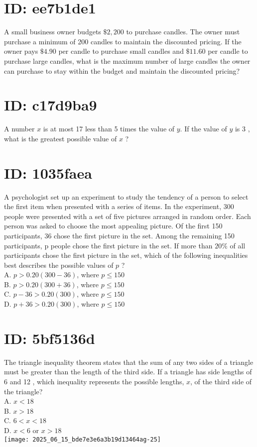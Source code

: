 
\section*{ID: ee7b1de1}
A small business owner budgets $\$ 2,200$ to purchase candles. The owner must purchase a minimum of 200 candles to maintain the discounted pricing. If the owner pays $\$ 4.90$ per candle to purchase small candles and $\$ 11.60$ per candle to purchase large candles, what is the maximum number of large candles the owner can purchase to stay within the budget and maintain the discounted pricing?

\section*{ID: c17d9ba9}
A number $x$ is at most 17 less than 5 times the value of $y$. If the value of $y$ is 3 , what is the greatest possible value of $x$ ?

\section*{ID: 1035faea}
A psychologist set up an experiment to study the tendency of a person to select the first item when presented with a series of items. In the experiment, 300 people were presented with a set of five pictures arranged in random order. Each person was asked to choose the most appealing picture. Of the first 150 participants, 36 chose the first picture in the set. Among the remaining 150 participants, p people chose the first picture in the set. If more than $20 \%$ of all participants chose the first picture in the set, which of the following inequalities best describes the possible values of $p$ ?\\
A. $p>0.20(300-36)$, where $p \leq 150$\\
B. $p>0.20(300+36)$, where $p \leq 150$\\
C. $p-36>0.20(300)$, where $p \leq 150$\\
D. $p+36>0.20(300)$, where $p \leq 150$

\section*{ID: 5bf5136d}
The triangle inequality theorem states that the sum of any two sides of a triangle must be greater than the length of the third side. If a triangle has side lengths of 6 and 12 , which inequality represents the possible lengths, $x$, of the third side of the triangle?\\
A. $x<18$\\
B. $x>18$\\
C. $6<x<18$\\
D. $x<6$ or $x>18$\\
\texttt{[image: 2025\_06\_15\_bde7e3e6a3b19d13464ag-25]}

